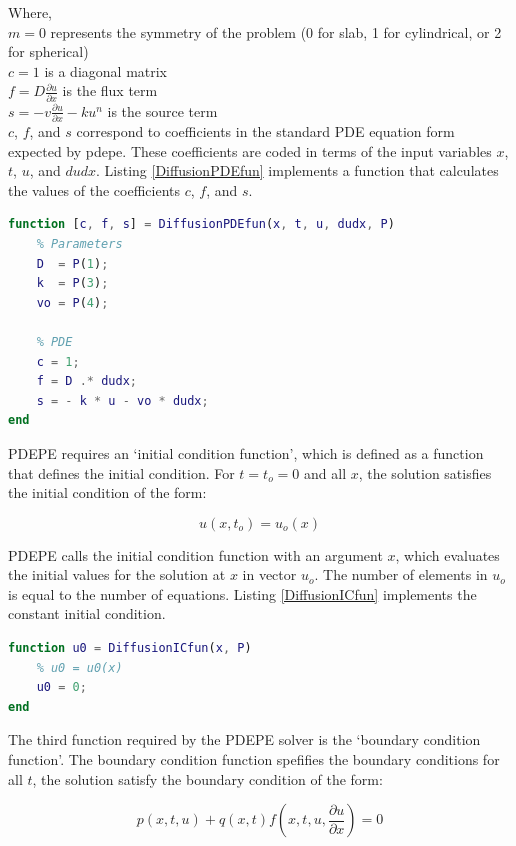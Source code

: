 \documentclass{article}
\begin{document}
Where, \\
$\displaystyle m = 0$ represents the symmetry of the problem (0 for slab, 1 for cylindrical, or 2 for spherical) \\
$\displaystyle c = 1$ is a diagonal matrix \\
$\displaystyle f = D \frac{\partial u}{\partial x}$ is the flux term\\
$\displaystyle s = - v \frac{\partial u}{\partial x} - k u^n$ is the source term \\
$c$, $f$, and $s$ correspond to coefficients in the standard PDE equation form expected by pdepe. These coefficients are coded in terms of the input variables $x$, $t$, $u$, and $dudx$. Listing \ref{DiffusionPDEfun} implements a function that calculates the values of the coefficients $c$, $f$, and $s$.

\begin{lstlisting}[language=Matlab, caption=PDE function for equations, label=DiffusionPDEfun]
function [c, f, s] = DiffusionPDEfun(x, t, u, dudx, P)
    % Parameters
    D  = P(1);
    k  = P(3);
    vo = P(4);
    
    % PDE
    c = 1;
    f = D .* dudx;
    s = - k * u - vo * dudx;
end
\end{lstlisting}

PDEPE requires an `initial condition function', which is defined as a function that defines the initial condition. For $t = t_o = 0$ and all $x$, the solution satisfies the initial condition of the form:

$$ u(x, t_o) = u_o(x) $$

PDEPE calls the initial condition function with an argument $x$, which evaluates the initial values for the solution at $x$ in vector $u_o$. The number of elements in $u_o$ is equal to the number of equations. Listing \ref{DiffusionICfun} implements the constant initial condition.

\begin{lstlisting}[language=Matlab, caption=Initial condition function, label=DiffusionICfun]
function u0 = DiffusionICfun(x, P)
    % u0 = u0(x)
    u0 = 0;
end
\end{lstlisting}

The third function required by the PDEPE solver is the `boundary condition function'. The boundary condition function spefifies the boundary conditions for all $t$, the solution satisfy the boundary condition of the form:

$$ p(x, t, u) + q(x, t) f \left( x, t, u, \frac{\partial u}{\partial x} \right) = 0 $$
\end{document}
